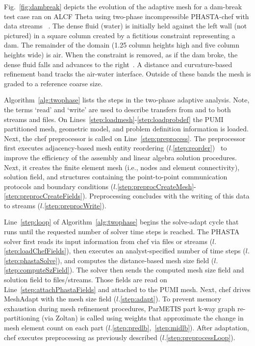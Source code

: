
Fig.~\ref{fig:dambreak} depicts the evolution of the adaptive mesh for a
dam-break test case ran on ALCF Theta using two-phase
incompressible PHASTA-chef with data streams~\cite{Rod13} .
The dense fluid (water) is initially held against the left wall (not pictured)
in a square column created by a fictitious constraint representing a dam.
The remainder of the domain (1.25 column heights high and five column heights wide)
is air.
When the constraint is removed, as if the dam broke, the dense fluid falls and
advances to the right~\cite{Rod13}.
A distance and curvature-based refinement band tracks the air-water interface.
Outside of these bands the mesh is graded to a reference coarse size.

Algorithm~\ref{alg:twophase} lists the steps in the two-phase adaptive analysis.
Note, the terms `read' and `write' are used to describe transfers from and to
both streams and files.
On Lines~\ref{step:loadmesh}-\ref{step:loadprobdef} the
PUMI partitioned mesh, geometric model, and problem definition
information is loaded.
Next, the chef preprocessor is called on Line~\ref{step:preprocess}.
The preprocessor first executes adjacency-based mesh entity
reordering ($l.$\ref{step:reorder})~\cite{zhou2010adjacency}
to improve the efficiency of the assembly and linear algebra solution
procedures.
Next, it creates the finite element mesh (i.e.,
nodes and element connectivity), solution field, and structures containing the
point-to-point communication protocols and boundary conditions
($l.$\ref{step:preprocCreateMesh}-\ref{step:preprocCreateFields}).
Preprocessing concludes with the writing of this data to streams
($l.$\ref{step:preprocWrite}).

Line~\ref{step:loop} of Algorithm~\ref{alg:twophase} begins the solve-adapt
cycle that runs until the requested number of solver time steps is reached.
The PHASTA solver first reads its input information from chef via files or streams
($l$.\ref{step:loadChefFields}),
then executes an analyst-specified number of time steps ($l$.\ref{step:phastaSolve}),
and computes the distance-based mesh size field ($l$.\ref{step:computeSzField}).
The solver then sends the computed mesh size field and solution field to
files/streams.
Those fields are read on Line~\ref{step:attachPhastaFields} and attached to the
PUMI mesh.
Next, chef drives MeshAdapt with the mesh size
field ($l$.\ref{step:adapt}).
To prevent memory exhaustion during mesh refinement procedures, ParMETIS part
k-way graph re-partitioning (via Zoltan) is called using weights that
approximate the change in mesh element count on each part
($l$.\ref{step:predlb},~\ref{step:midlb}).
After adaptation, chef executes preprocessing as previously described
($l$.\ref{step:preprocessLoop}).

